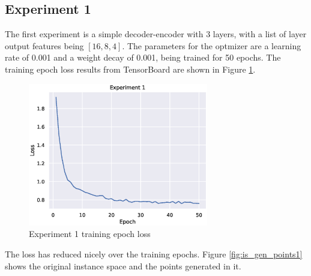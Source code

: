 \subsection{Experiment 1}

The first experiment is a simple decoder-encoder with 3 layers, with a list of layer output features being $[16, 8, 4]$. The parameters for the optmizer are a learning rate of 0.001 and a weight decay of 0.001, being trained for 50 epochs. The training epoch loss results from TensorBoard are shown in Figure \ref{fig:exp1}.

\begin{figure}[H]
    \centering
    \includegraphics[width=0.7\textwidth]{Cap5/loss_exp1}
    \caption{Experiment 1 training epoch loss}
    \label{fig:exp1}
\end{figure}

The loss has reduced nicely over the training epochs. Figure \ref{fig:is_gen_points1} shows the original instance space and the points generated in it.

